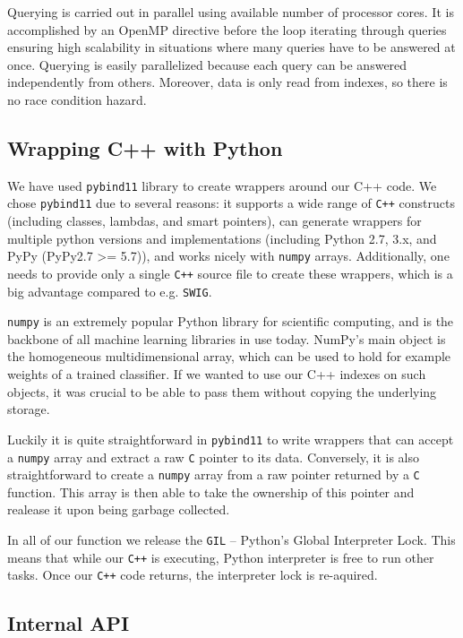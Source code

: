 Querying is carried out in parallel using available number of processor cores.
It is accomplished by an OpenMP directive
before the loop iterating through queries ensuring high scalability in situations
where many queries have to be answered at once.
Querying is easily parallelized because each query can be answered independently from others.
Moreover, data is only read from indexes, so there is no race condition hazard.

\subsection{Wrapping C++ with Python}

We have used \texttt{pybind11}\cite{pybind11} library to create wrappers around our C++ code. We chose \texttt{pybind11}
due to several reasons: it supports a wide range of \texttt{C++} constructs
(including classes, lambdas, and smart pointers), can generate wrappers for multiple python versions and
implementations (including Python 2.7, 3.x, and PyPy (PyPy2.7 >= 5.7)), and works nicely with \texttt{numpy} arrays.
Additionally, one needs to provide only a single \texttt{C++} source file to create these wrappers, which is
a big advantage compared to e.g. \texttt{SWIG}.

\texttt{numpy} is an extremely popular Python library for scientific computing, and is the backbone of all
machine learning libraries in use today. NumPy’s main object is the homogeneous multidimensional array, which
can be used to hold for example weights of a trained classifier. If we wanted to use our C++ indexes on such
objects, it was crucial to be able to pass them without copying the underlying storage.

Luckily it is quite straightforward in \texttt{pybind11} to write wrappers that can accept a \texttt{numpy} array
and extract a raw \texttt{C} pointer to its data. Conversely, it is also straightforward to create
a \texttt{numpy} array from a raw pointer returned by a \texttt{C} function. This array is then able to take the
ownership of this pointer and realease it upon being garbage collected.

In all of our function we release the \texttt{GIL} -- Python's Global Interpreter Lock. This means that while our
\texttt{C++} is executing, Python interpreter is free to run other tasks. Once our \texttt{C++} code returns, the
interpreter lock is re-aquired.

\subsection{Internal API}

